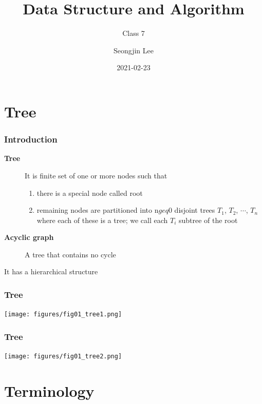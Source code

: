 \documentclass[newPxFont,sthlmFooter,nooffset]{beamer}
\title{Data Structure and Algorithm}
\subtitle{Class 7}
\author[SJL]{Seongjin Lee}
\institute{\href{mailto:insight@gnu.ac.kr}{insight@gnu.ac.kr}\\\url{http://resourceful.github.io}\\Systems Research Lab.\\GNU}
\date{2021-02-23}
\begin{document}
\frame[plain,t]{\titlepage} 




\section{Tree} 
\begin{frame}[t]
  \frametitle{Introduction}
  \begin{description}
  \item[\textbf{Tree}] It is finite set of one or more nodes such that
    \begin{enumerate}
      \item there is a special node called root
      \item remaining nodes are partitioned into n$geq$0 disjoint trees $T_1$, $T_2$, $\cdots$, $T_n$ where each of these is a tree; we call each $T_i$ subtree of the root
    \end{enumerate}
  \item[\textbf{Acyclic graph}] A tree that contains no cycle
  \end{description}

It has a hierarchical structure
\end{frame}

\begin{frame}[t]
  \frametitle{Tree}
  \begin{center}
    \texttt{[image: figures/fig01\_tree1.png]}
  \end{center}

\end{frame}

\begin{frame}[t]
  \frametitle{Tree}
  \begin{center}
    \texttt{[image: figures/fig01\_tree2.png]}
  \end{center}

\end{frame}

\section{Terminology}
\end{document}
